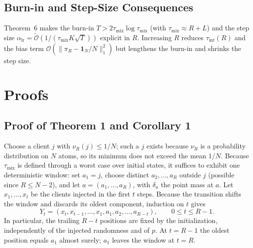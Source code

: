 \documentclass[twoside,11pt]{article}
\begin{document}
\subsection{\texorpdfstring{Burn-in and Step-Size Consequences}{Burn-in and Step-Size Consequences}}
Theorem~6 makes the burn-in $T>2\tau_{\mathrm{mix}}\log\tau_{\mathrm{mix}}$
(with $\tau_{\mathrm{mix}}\approx R+L$) and the step size
$\alpha_{\mathrm{lr}}=\widetilde{\mathcal{O}}(1/(\tau_{\mathrm{mix}}K\sqrt T))$
explicit in $R$. Increasing $R$ reduces $\tau_{\mathrm{int}}(R)$ and the bias
term $\mathcal{O}(\|\pi_R-\mathbf{1}_N/N\|_1^{2})$ but lengthens the burn-in
and shrinks the step size.
\label{sec:utility}

\section{Proofs}
\subsection{Proof of Theorem 1 and Corollary 1}
Choose a client $j$ with $\nu_R(j)\leq1/N$; such a $j$ exists because $\nu_R$ is a probability distribution on $N$ atoms, so its minimum does not exceed the mean $1/N$. Because $\tau_{\mathrm{mix}}$ is defined through a worst case over initial states, it suffices to exhibit one deterministic window: set $a_1=j$, choose distinct $a_2,\dots,a_R$ outside $j$ (possible since $R\leq N-2$), and let $a=(a_1,\dots,a_R)$, with $\delta_a$ the point mass at $a$. Let $x_1,\dots,x_t$ be the clients injected in the first $t$ steps. Because the transition shifts the window and discards its oldest component, induction on $t$ gives
\begin{equation}\label{eq:e32}
Y_t=(x_t,x_{t-1},\dots,x_1,a_1,a_2,\dots,a_{R-t}),\qquad 0\leq t\leq R-1.
\end{equation}
In particular, the trailing $R-t$ positions are fixed by the initialization, independently of the injected randomness and of $p$. At $t=R-1$ the oldest position equals $a_1$ almost surely; $a_1$ leaves the window at $t=R$.
\end{document}
